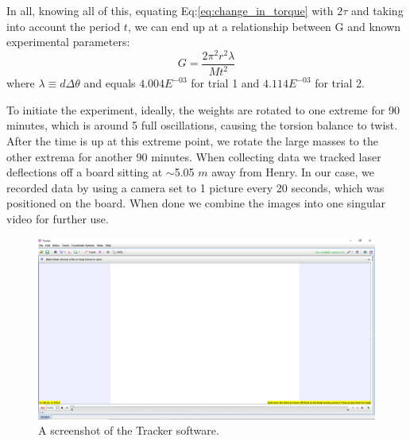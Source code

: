 \documentclass[a4paper,12pt,english]{all-in-one} %
\begin{document}
{In all, knowing all of this, equating Eq:\eqref{eq:change_in_torque} with $2\tau$ and taking into account the period $t$, we can end up at a relationship between G and known experimental parameters:
\begin{equation}\label{eq:grav_constant}
   G = \frac{2\pi^2r^2\lambda}{Mt^2}
\end{equation}
where $\lambda \equiv d\Delta\theta$ and equals $4.004E^{-03}$ for trial 1 and $4.114E^{-03}$ for trial 2.

To initiate the experiment, ideally, the weights are rotated to one extreme for 90 minutes, which is around 5 full oscillations, causing the torsion balance to twist. After the time is up at this extreme point, we rotate the large masses to the other extrema for another 90 minutes. When collecting data we tracked laser deflections off a board sitting at $\sim$5.05 $m$ away from Henry. In our case, we recorded data by using a camera set to 1 picture every 20 seconds, which was positioned on the board. When done we combine the images into one singular video for further use.


}

\begin{figure}[h]
    \centering
    \includegraphics[width=1.0\linewidth]{7-cavendish/overleaf/droc/images/Capture.PNG}
    \caption{ A screenshot of the Tracker software.}
    \label{fig: cavendish tracker}
\end{figure}
\end{document}
